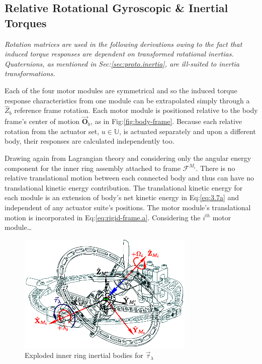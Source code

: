 \subsection{Relative Rotational Gyroscopic \& Inertial Torques}
\label{subsec:dynamics.nonlinearities.gyrotorques}
\emph{\color{gray}Rotation matrices are used in the following derivations owing to the fact that induced torque responses are dependent on transformed rotational inertias. Quaternions, as mentioned in Sec:\ref{sec:proto.inertia}, are ill-suited to inertia transformations.}
\par
Each of the four motor modules are symmetrical and so the induced torque response characteristics from one module can be extrapolated simply through a $\hat{Z}_b$ reference frame rotation. Each motor module is positioned relative to the body frame's center of motion $\vec{\mathbf{O}}_b$, as in Fig:\ref{fig:body-frame}. Because each relative rotation from the actuator set, $u\in\mathbb{U}$, is actuated separately and upon a different body, their responses are calculated independently too.
\par
Drawing again from Lagrangian theory and considering only the angular energy component for the inner ring assembly attached to frame $\mathcal{F}^{M_i}$. There is no relative translational motion between each connected body and thus can have no translational kinetic energy contribution. The translational kinetic energy for each module is an extension of body's net kinetic energy in Eq:\ref{eq:3.7a} and independent of any actuator suite's positions. The motor module's translational motion is incorporated in Eq:\ref{eq:rigid-frame.a}. Considering the $i^{th}$ motor module\ldots
\begin{figure}[htbp]
\centering
\includegraphics[width=0.75\textwidth]{figs/response-inner}
\caption{Exploded inner ring inertial bodies for $\vec{\tau}_\lambda$}
\label{fig:response-inner}
\vspace{-12pt}
\end{figure}
